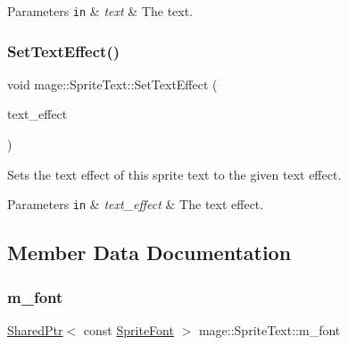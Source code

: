 \begin{DoxyParams}[1]{Parameters}
\mbox{\tt in}  & {\em text} & The text. \\
\hline
\end{DoxyParams}
\hypertarget{classmage_1_1_sprite_text_ae258a31796c3fa6b8c31e0b98010a0ef}{}\label{classmage_1_1_sprite_text_ae258a31796c3fa6b8c31e0b98010a0ef} 
\subsubsection{\texorpdfstring{Set\+Text\+Effect()}{SetTextEffect()}}
{\footnotesize\ttfamily void mage\+::\+Sprite\+Text\+::\+Set\+Text\+Effect (\begin{DoxyParamCaption}\item[{\hyperlink{classmage_1_1_sprite_text_a4d3101d037b6fe4247d77b5fbf811dd2}{Text\+Effect}}]{text\+\_\+effect }\end{DoxyParamCaption})\hspace{0.3cm}{\ttfamily [noexcept]}}

Sets the text effect of this sprite text to the given text effect.


\begin{DoxyParams}[1]{Parameters}
\mbox{\tt in}  & {\em text\+\_\+effect} & The text effect. \\
\hline
\end{DoxyParams}


\subsection{Member Data Documentation}
\hypertarget{classmage_1_1_sprite_text_a7d5f122cd5a87e47786796e41dbf6b71}{}\label{classmage_1_1_sprite_text_a7d5f122cd5a87e47786796e41dbf6b71} 
\subsubsection{\texorpdfstring{m\+\_\+font}{m\_font}}
{\footnotesize\ttfamily \hyperlink{namespacemage_a1e01ae66713838a7a67d30e44c67703e}{Shared\+Ptr}$<$ const \hyperlink{classmage_1_1_sprite_font}{Sprite\+Font} $>$ mage\+::\+Sprite\+Text\+::m\+\_\+font\hspace{0.3cm}{\ttfamily [private]}}

